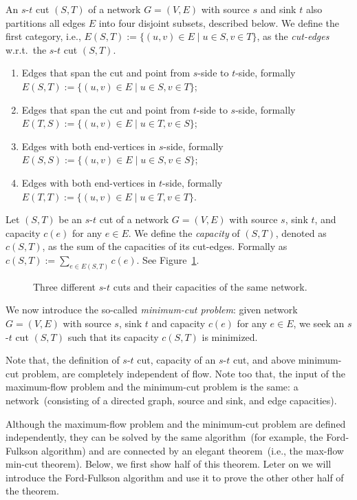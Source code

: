 An $s$-$t$ cut $(S, T)$ of a network $G = (V, E)$ with source $s$ and sink $t$ also partitions all
edges $E$ into four disjoint subsets, described below. 
We define the first category, i.e., $E(S, T) := \{(u,v)\in E\mid u\in S, v\in T\}$,
as the \emph{cut-edges} w.r.t.\ the $s$-$t$ cut $(S, T)$.
\vspace*{-\topsep}
\begin{enumerate}
\item Edges that span the cut and point from $s$-side to $t$-side, formally $E(S, T) := \{(u,v)\in E\mid u\in S, v\in T\}$;
\item Edges that span the cut and point from $t$-side to $s$-side, formally $E(T, S) := \{(u,v)\in E\mid u\in T, v\in S\}$;
\item Edges with both end-vertices in $s$-side, formally $E(S, S) := \{(u,v)\in E\mid u\in S, v\in S\}$;
\item Edges with both end-vertices in $t$-side, formally $E(T, T) := \{(u,v)\in E\mid u\in T, v\in T\}$.
\end{enumerate}

Let $(S, T)$ be an $s$-$t$ cut of a network $G = (V, E)$ with source $s$, sink $t$, and capacity $c(e)$ for any $e\in E$.
We define the \emph{capacity} of $(S, T)$, denoted as $c(S, T)$, as the sum of the capacities of its cut-edges. Formally
as $c(S, T) := \sum_{e\in E(S, T)} c(e)$. See Figure~\ref{fig:flow-cut}.

\begin{figure}[h]
\centering{}
\caption{Three different $s$-$t$ cuts and their capacities of the same network.}
\label{fig:flow-cut}
\end{figure}

We now introduce the so-called \emph{minimum-cut problem}: given network $G = (V, E)$ with source $s$, sink $t$ and capacity $c(e)$ for any $e\in E$,
   we seek an $s$-$t$ cut $(S, T)$ such that its capacity $c(S, T)$ is minimized.

Note that, the definition of $s$-$t$ cut, capacity of an $s$-$t$ cut, and above minimum-cut problem,
are completely independent of flow. Note too that, the input of the maximum-flow problem and the minimum-cut
problem is the same: a network~(consisting of a directed graph, source and sink, and edge capacities).

Although the maximum-flow problem and the minimum-cut problem are defined independently, they
can be solved by the same algorithm~(for example, the Ford-Fulkson algorithm)
and are connected by an elegant theorem~(i.e., the max-flow min-cut theorem).
Below, we first show half of this theorem.
Leter on we will introduce the Ford-Fulkson algorithm
and use it to prove the other other half of the theorem.

